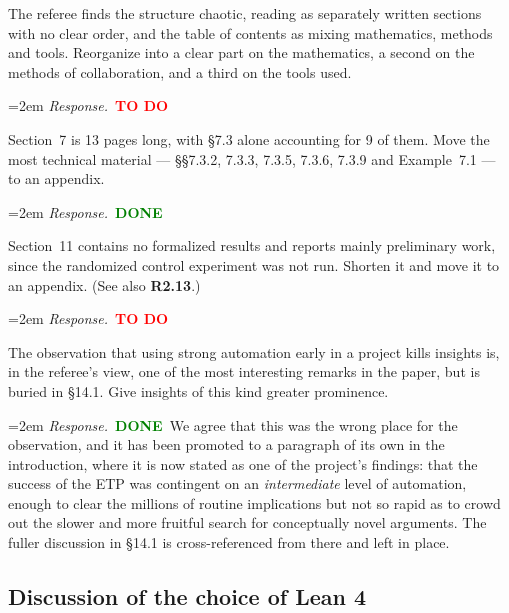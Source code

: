 \documentclass[11pt]{amsart}
\newcommand{\todo}{\textcolor{red}{\textbf{TO DO}}}
\newcommand{\done}{\textcolor{green}{\textbf{DONE}}}
\newcommand{\response}[1]{%
  \par\smallskip
  \noindent\hangindent=2em\hangafter=1
  \textit{Response.}\ #1
  \par\smallskip}
\begin{document}
\begin{requests}[resume]

\item The referee finds the structure chaotic, reading as separately written sections
with no clear order, and the table of contents as mixing mathematics, methods and
tools. Reorganize into a clear part on the mathematics, a second on the methods of
collaboration, and a third on the tools used.
\response{\todo}

\item Section~7 is 13 pages long, with \S7.3 alone accounting for 9 of them. Move the
most technical material --- \S\S7.3.2, 7.3.3, 7.3.5, 7.3.6, 7.3.9 and Example~7.1 ---
to an appendix.
\response{\done}

\item Section~11 contains no formalized results and reports mainly preliminary work,
since the randomized control experiment was not run. Shorten it and move it to an
appendix. (See also \textbf{R2.13}.)
\response{\todo}

\item The observation that using strong automation early in a project kills insights
is, in the referee's view, one of the most interesting remarks in the paper, but is
buried in \S14.1. Give insights of this kind greater prominence.
\response{\done\ We agree that this was the wrong place for the observation, and it has been
promoted to a paragraph of its own in the introduction, where it is now stated as one of
the project's findings: that the success of the ETP was contingent on an
\emph{intermediate} level of automation, enough to clear the millions of routine
implications but not so rapid as to crowd out the slower and more fruitful search for
conceptually novel arguments. The fuller discussion in \S14.1 is cross-referenced from
there and left in place.}

\end{requests}

\subsection*{Discussion of the choice of Lean 4}
\end{document}
